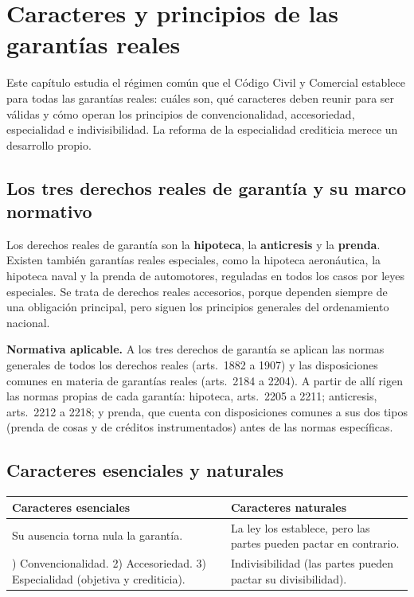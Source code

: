 \documentclass[12pt,oneside]{book}
\begin{document}
\chapter{Caracteres y principios de las garantías reales}\label{cap:garantias-carac}

Este capítulo estudia el régimen común que el Código Civil y Comercial establece para todas las garantías reales: cuáles son, qué caracteres deben reunir para ser válidas y cómo operan los principios de convencionalidad, accesoriedad, especialidad e indivisibilidad. La reforma de la especialidad crediticia merece un desarrollo propio.

\section{Los tres derechos reales de garantía y su marco normativo}

Los derechos reales de garantía son la \textbf{hipoteca}, la \textbf{anticresis} y la \textbf{prenda}. Existen también garantías reales especiales, como la hipoteca aeronáutica, la hipoteca naval y la prenda de automotores, reguladas en todos los casos por leyes especiales. Se trata de derechos reales accesorios, porque dependen siempre de una obligación principal, pero siguen los principios generales del ordenamiento nacional.

\begin{important}
\textbf{Normativa aplicable.} A los tres derechos de garantía se aplican las normas generales de todos los derechos reales (arts.~1882 a 1907) y las disposiciones comunes en materia de garantías reales (arts.~2184 a 2204). A partir de allí rigen las normas propias de cada garantía: hipoteca, arts.~2205 a 2211; anticresis, arts.~2212 a 2218; y prenda, que cuenta con disposiciones comunes a sus dos tipos (prenda de cosas y de créditos instrumentados) antes de las normas específicas.
\end{important}

\section{Caracteres esenciales y naturales}

\begin{table}[H]
\centering
\begin{tabularx}{\textwidth}{@{}LL@{}}
\toprule
\textbf{Caracteres esenciales} & \textbf{Caracteres naturales} \\
\midrule
Su ausencia torna nula la garantía. & La ley los establece, pero las partes pueden pactar en contrario. \\
) Convencionalidad. 2) Accesoriedad. 3) Especialidad (objetiva y crediticia). & Indivisibilidad (las partes pueden pactar su divisibilidad). \\
\bottomrule
\end{tabularx}
\end{table}
\end{document}
